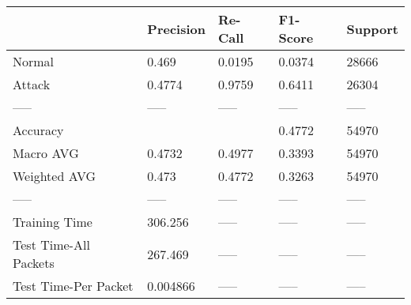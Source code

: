 \begin{tabular}{lllll}
\toprule
{} & Precision & Re-Call & F1-Score & Support \\
\midrule
Normal                &     0.469 &  0.0195 &   0.0374 &   28666 \\
Attack                &    0.4774 &  0.9759 &   0.6411 &   26304 \\
-----                 &     ----- &   ----- &    ----- &   ----- \\
Accuracy              &           &         &   0.4772 &   54970 \\
Macro AVG             &    0.4732 &  0.4977 &   0.3393 &   54970 \\
Weighted AVG          &     0.473 &  0.4772 &   0.3263 &   54970 \\
-----                 &     ----- &   ----- &    ----- &   ----- \\
Training Time         &   306.256 &   ----- &    ----- &   ----- \\
Test Time-All Packets &   267.469 &   ----- &    ----- &   ----- \\
Test Time-Per Packet  &  0.004866 &   ----- &    ----- &   ----- \\
\bottomrule
\end{tabular}
